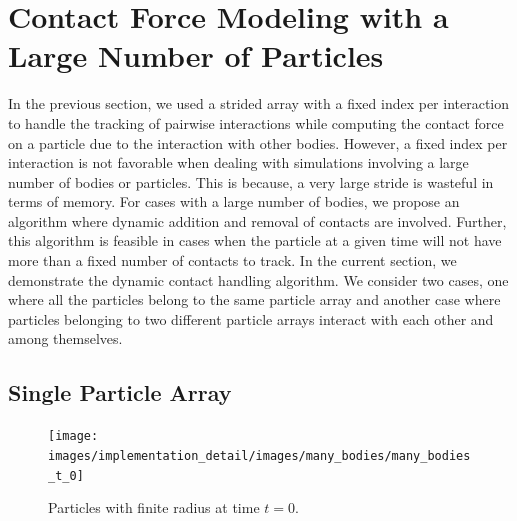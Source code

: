 \FloatBarrier%
\section{Contact Force Modeling with a Large Number of Particles}
\label{sec:tracking-many-bodies}
In the previous section, we used a strided array with a fixed index per
interaction to handle the tracking of pairwise interactions while computing the
contact force on a particle due to the interaction with other bodies. However, a
fixed index per interaction is not favorable when dealing with simulations
involving a large number of bodies or particles. This is because, a very large
stride is wasteful in terms of memory. For cases with a large number of bodies,
we propose an algorithm where dynamic addition and removal of contacts are
involved. Further, this algorithm is feasible in cases when the particle at a
given time will not have more than a fixed number of contacts to track. In the
current section, we demonstrate the dynamic contact handling algorithm. We
consider two cases, one where all the particles belong to the same particle
array and another case where particles belonging to two different particle
arrays interact with each other and among themselves.

\subsection{Single Particle Array}
\begin{figure}[!htpb]
  \centering
  \texttt{[image: images/implementation\_detail/images/many\_bodies/many\_bodies\_t\_0]}
  \caption{Particles with finite radius at time $t=0$.}
\label{fig:id:15_particle_t_0}
\end{figure}

